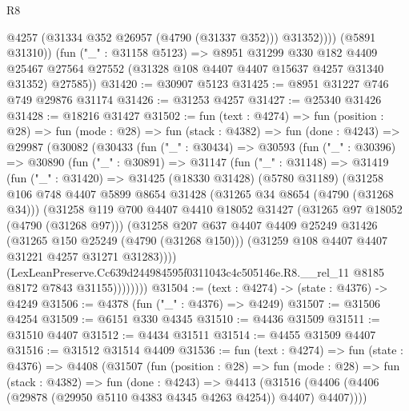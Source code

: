 \begin{lexlean}{R8}
\begin{coremodule}
                @4257
                (@31334 @352 @26957 (@4790 (@31337 @352)))
                @31352))))
        (@5891 @31310))
      (fun ("_" : @31158 @5123) =>
      @8951
        @31299
        @330
        @182
        @4409
        @25467
        @27564
        @27552
        (@31328 @108 @4407 @4407 @15637 @4257 @31340 @31352)
        @27585))
@31420 := @30907 @5123
@31425 := @8951 @31227 @746 @749 @29876 @31174
@31426 := @31253 @4257
@31427 := @25340 @31426
@31428 := @18216 @31427
@31502 := fun (text : @4274) =>
  fun (position : @28) =>
  fun (mode : @28) =>
  fun (stack : @4382) =>
  fun (done : @4243) =>
  @29987
    (@30082
      (@30433
        (fun ("_" : @30434) =>
        @30593
          (fun ("_" : @30396) =>
          @30890
            (fun ("_" : @30891) =>
            @31147
              (fun ("_" : @31148) =>
              @31419
                (fun ("_" : @31420) =>
                @31425
                  (@18330 @31428)
                  (@5780 @31189)
                  (@31258
                    @106
                    @748
                    @4407
                    @5899
                    @8654
                    @31428
                    (@31265 @34 @8654 (@4790 (@31268 @34)))
                    (@31258
                      @119
                      @700
                      @4407
                      @4410
                      @18052
                      @31427
                      (@31265 @97 @18052 (@4790 (@31268 @97)))
                      (@31258
                        @207
                        @637
                        @4407
                        @4409
                        @25249
                        @31426
                        (@31265 @150 @25249 (@4790 (@31268 @150)))
                        (@31259 @108 @4407 @4407 @31221 @4257 @31271 @31283))))
                  (LexLeanPreserve.Cc639d244984595f0311043c4c505146e.R8.__rel_11
                    @8185
                    @8172
                    @7843
                    @31155))))))))
@31504 := (text : @4274) -> (state : @4376) -> @4249
@31506 := @4378 (fun ("_" : @4376) => @4249)
@31507 := @31506 @4254
@31509 := @6151 @330 @4345
@31510 := @4436 @31509
@31511 := @31510 @4407
@31512 := @4434 @31511
@31514 := @4455 @31509 @4407
@31516 := @31512 @31514 @4409
@31536 := fun (text : @4274) =>
  fun (state : @4376) =>
  @4408
    (@31507
      (fun (position : @28) =>
      fun (mode : @28) =>
      fun (stack : @4382) =>
      fun (done : @4243) =>
      @4413 (@31516 (@4406 (@4406 (@29878 (@29950 @5110 @4383 @4345 @4263 @4254)) @4407) @4407))))

\end{coremodule}
\end{lexlean}

